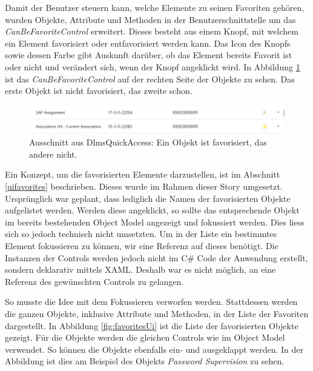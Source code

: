 Damit der Benutzer steuern kann, welche Elemente zu seinen Favoriten gehören, wurden Objekte, Attribute und Methoden in der Benutzerschnittstelle um das \textit{CanBeFavoriteControl} erweitert.
Dieses besteht aus einem Knopf, mit welchem ein Element favorisiert oder entfavorisiert werden kann.
Das Icon des Knopfs sowie dessen Farbe gibt Auskunft darüber, ob das Element bereits Favorit ist oder nicht und verändert sich, wenn der Knopf angeklickt wird.
In Abbildung \ref{fig:objectModelWithFavorites} ist das \textit{CanBeFavoriteControl} auf der rechten Seite der Objekte zu sehen.
Das erste Objekt ist nicht favorisiert, das zweite schon.

\begin{figure}
   \centering
   \includegraphics[width=1.0\textwidth]{gfx/objectModelWithFavorites.png}
   \caption{
      Ausschnitt aus DlmsQuickAccess: Ein Objekt ist favorisiert, das andere nicht.
      }
   \label{fig:objectModelWithFavorites}
\end{figure}

Ein Konzept, um die favorisierten Elemente darzustellen, ist im Abschnitt \ref{uifavorites} beschrieben.
Dieses wurde im Rahmen dieser Story umgesetzt.
Ursprünglich war geplant, dass lediglich die Namen der favorisierten Objekte aufgelistet werden.
Werden diese angeklickt, so sollte das entsprechende Objekt im bereits bestehenden Object Model angezeigt und fokussiert werden.
Dies liess sich so jedoch technisch nicht umsetzten.
Um in der Liste ein bestimmtes Element fokussieren zu können, wir eine Referenz auf dieses benötigt.
Die Instanzen der Controls werden jedoch nicht im C\# Code der Anwendung erstellt, sondern deklarativ mittels XAML.
Deshalb war es nicht möglich, an eine Referenz des gewünschten Controls zu gelangen.

So musste die Idee mit dem Fokussieren verworfen werden.
Stattdessen werden die ganzen Objekte, inklusive Attribute und Methoden, in der Liste der Favoriten dargestellt.
In Abbildung \ref{fig:favoritesUi} ist die Liste der favorisierten Objekte gezeigt.
Für die Objekte werden die gleichen Controls wie im Object Model verwendet.
So können die Objekte ebenfalls ein- und ausgeklappt werden.
In der Abbildung ist dies am Beispiel des Objekts \textit{Password Supervision} zu sehen.

